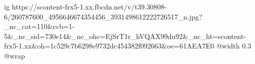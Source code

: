  
 
 
 
 

\ifcmt
  ig https://scontent-frx5-1.xx.fbcdn.net/v/t39.30808-6/260787600_4956646674354456_3931498612222726517_n.jpg?_nc_cat=110&ccb=1-5&_nc_sid=730e14&_nc_ohc=EjSrT1r_hVQAX99du92&_nc_ht=scontent-frx5-1.xx&oh=1c529c7b6298e9732dc454382f092663&oe=61AEA7E0
  @width 0.3
  @wrap 
\fi

